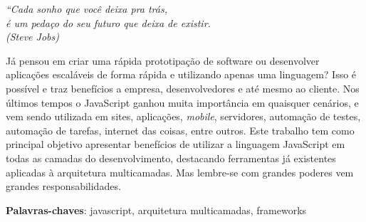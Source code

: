 \documentclass[
	12pt,				%
	openright,			%
	twoside,			%
	a4paper,			%
	english,			%
	brazil				%
	]{abntex2}
\begin{document}


\begin{epigrafe}
    \vspace*{\fill}
	\begin{flushright}
		\textit{``Cada sonho que você deixa pra trás,\\
		é um pedaço do seu futuro que deixa de existir. \\
		(Steve Jobs)}
	\end{flushright}
\end{epigrafe}


\setlength{\absparsep}{18pt} %
\begin{resumo}
Já pensou em criar uma rápida prototipação de software ou desenvolver aplicações escaláveis de forma rápida e utilizando apenas uma linguagem? Isso é possível e traz benefícios a empresa, desenvolvedores e até mesmo ao cliente. Nos últimos tempos o JavaScript ganhou muita importância em quaisquer cenários, e vem sendo utilizada em sites, aplicações, \textit{mobile}, servidores, automação de testes, automação de tarefas, internet das coisas, entre outros. Este trabalho tem como principal objetivo apresentar benefícios de utilizar a linguagem JavaScript em todas as camadas do desenvolvimento, destacando ferramentas já existentes aplicadas à arquitetura multicamadas. Mas lembre-se com grandes poderes vem grandes responsabilidades.

 \vspace{\onelineskip}

 \textbf{Palavras-chaves}: javascript, arquitetura multicamadas, frameworks
\end{resumo}
\end{document}
